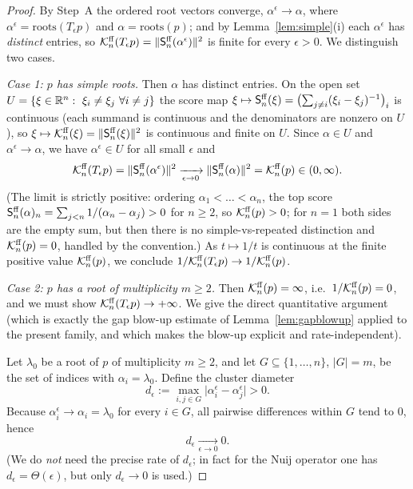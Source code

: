 \begin{proof}
By Step~A the ordered root vectors converge, $\alpha^\epsilon\to\alpha$, where
$\alpha^\epsilon=\mathrm{roots}(T_\epsilon p)$ and $\alpha=\mathrm{roots}(p)$; and by
Lemma~\ref{lem:simple}(i) each $\alpha^\epsilon$ has \emph{distinct} entries, so
$\mathcal{K}^{\mathrm{ff}}_n(T_\epsilon p)=\|\mathsf{S}^{\mathrm{ff}}_n(\alpha^\epsilon)\|^2$ is finite for every
$\epsilon>0$. We distinguish two cases.

\smallskip\noindent\emph{Case 1: $p$ has simple roots.} Then $\alpha$ has distinct
entries. On the open set $U=\{\xi\in\mathbb{R}^n:\ \xi_i\ne\xi_j\ \forall i\ne j\}$ the
score map $\xi\mapsto\mathsf{S}^{\mathrm{ff}}_n(\xi)=\bigl(\sum_{j\ne i}(\xi_i-\xi_j)^{-1}\bigr)_i$
is continuous (each summand is continuous and the denominators are nonzero on $U$),
so $\xi\mapsto\mathcal{K}^{\mathrm{ff}}_n(\xi)=\|\mathsf{S}^{\mathrm{ff}}_n(\xi)\|^2$ is continuous and finite on $U$.
Since $\alpha\in U$ and $\alpha^\epsilon\to\alpha$, we have $\alpha^\epsilon\in U$ for
all small $\epsilon$ and
\[
\mathcal{K}^{\mathrm{ff}}_n(T_\epsilon p)=\|\mathsf{S}^{\mathrm{ff}}_n(\alpha^\epsilon)\|^2
\xrightarrow[\epsilon\to0]{}\|\mathsf{S}^{\mathrm{ff}}_n(\alpha)\|^2=\mathcal{K}^{\mathrm{ff}}_n(p)\in(0,\infty).
\]
(The limit is strictly positive: ordering $\alpha_1<\dots<\alpha_n$, the top score
$\mathsf{S}^{\mathrm{ff}}_n(\alpha)_n=\sum_{j<n}1/(\alpha_n-\alpha_j)>0$ for $n\ge2$, so
$\mathcal{K}^{\mathrm{ff}}_n(p)>0$; for $n=1$ both sides are the empty sum, but then there is no
simple-vs-repeated distinction and $\mathcal{K}^{\mathrm{ff}}_n(p)=0$, handled by the convention.)
As $t\mapsto1/t$ is continuous at the finite positive value $\mathcal{K}^{\mathrm{ff}}_n(p)$, we
conclude $1/\mathcal{K}^{\mathrm{ff}}_n(T_\epsilon p)\to1/\mathcal{K}^{\mathrm{ff}}_n(p)$.

\smallskip\noindent\emph{Case 2: $p$ has a root of multiplicity $m\ge2$.} Then
$\mathcal{K}^{\mathrm{ff}}_n(p)=\infty$, i.e.\ $1/\mathcal{K}^{\mathrm{ff}}_n(p)=0$, and we must show
$\mathcal{K}^{\mathrm{ff}}_n(T_\epsilon p)\to+\infty$. We give the direct quantitative argument
(which is exactly the gap blow-up estimate of Lemma~\ref{lem:gapblowup} applied to
the present family, and which makes the blow-up explicit and rate-independent).

Let $\lambda_0$ be a root of $p$ of multiplicity $m\ge2$, and let
$G\subseteq\{1,\dots,n\}$, $|G|=m$, be the set of indices with $\alpha_i=\lambda_0$.
Define the cluster diameter
\[
d_\epsilon:=\max_{i,j\in G}\bigl|\alpha^\epsilon_i-\alpha^\epsilon_j\bigr|>0 .
\]
Because $\alpha^\epsilon_i\to\alpha_i=\lambda_0$ for every $i\in G$, all pairwise
differences within $G$ tend to $0$, hence
\begin{equation}\label{eq:deps}
d_\epsilon\xrightarrow[\epsilon\to0]{}0 .
\end{equation}
(We do \emph{not} need the precise rate of $d_\epsilon$; in fact for the Nuij
operator one has $d_\epsilon=\Theta(\epsilon)$, but only $d_\epsilon\to0$ is used.)


\end{proof}
